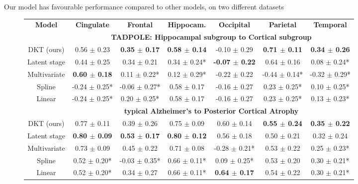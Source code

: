 \documentclass[portrait,a0,final,20pt]{a0poster}
\newcommand{\fnt}[1]{\LARGE{#1}}
\begin{document}
{\begin{multicols}{2}
\fnt{Our model has favourable performance compared to other models, on two different datasets}\\
\begin{figure}[H]
\fontsize{27}{30}\selectfont
\begin{tabular}{c | c c c c c c}
\textbf{Model} & \textbf{Cingulate} & \textbf{Frontal} & \textbf{Hippocam.} & \textbf{Occipital} & \textbf{Parietal} & \textbf{Temporal}\\
& \multicolumn{6}{c}{\textbf{TADPOLE: Hippocampal subgroup to Cortical subgroup}}\\
DKT (ours) &      0.56 $\pm$ 0.23 &    \textbf{0.35 $\pm$ 0.17} &        \textbf{0.58 $\pm$ 0.14} &     -0.10 $\pm$ 0.29 &     \textbf{0.71 $\pm$ 0.11} &     \textbf{0.34 $\pm$ 0.26} \\
Latent stage &      0.44 $\pm$ 0.25 &    0.34 $\pm$ 0.21 &       0.34 $\pm$ 0.24* &     \textbf{-0.07 $\pm$ 0.22} &     0.64 $\pm$ 0.16 &    0.08 $\pm$ 0.24* \\
Multivariate &      \textbf{0.60 $\pm$ 0.18} &   0.11 $\pm$ 0.22* &       0.12 $\pm$ 0.29* &     -0.22 $\pm$ 0.22 &   -0.44 $\pm$ 0.14* &   -0.32 $\pm$ 0.29* \\
Spline &    -0.24 $\pm$ 0.25* &  -0.06 $\pm$ 0.27* &        0.58 $\pm$ 0.17 &     -0.16 $\pm$ 0.27 &    0.23 $\pm$ 0.25* &    0.10 $\pm$ 0.25* \\
Linear &    -0.24 $\pm$ 0.25* &   0.20 $\pm$ 0.25* &        0.58 $\pm$ 0.17 &     -0.16 $\pm$ 0.27 &    0.23 $\pm$ 0.25* &    0.13 $\pm$ 0.23* \\
& \multicolumn{6}{c}{\textbf{typical Alzheimer's to Posterior Cortical Atrophy}}\\
DKT (ours) &    0.77 $\pm$ 0.11 &    0.39 $\pm$ 0.26 &      0.75 $\pm$ 0.09 &    0.60 $\pm$ 0.14 &    \textbf{0.55 $\pm$ 0.24} &    \textbf{0.35 $\pm$ 0.22} \\
Latent stage &    \textbf{0.80 $\pm$ 0.09} &    \textbf{0.53 $\pm$ 0.17} &      \textbf{0.80 $\pm$ 0.12} &    0.56 $\pm$ 0.18 &    0.50 $\pm$ 0.21 &    0.32 $\pm$ 0.24 \\
Multivariate &   0.73 $\pm$ 0.09 &   0.45 $\pm$ 0.22  &    0.71 $\pm$ 0.08 & -0.28 $\pm$ 0.21* &  0.53 $\pm$ 0.22  &  0.25 $\pm$ 0.23* \\
Spline &   0.52 $\pm$ 0.20* &  -0.03 $\pm$ 0.35* &     0.66 $\pm$ 0.11* &   0.09 $\pm$ 0.25* &    0.53 $\pm$ 0.20 &   0.30 $\pm$ 0.21* \\
Linear &   0.52 $\pm$ 0.20* &    0.34 $\pm$ 0.27 &     0.66 $\pm$ 0.11* &    \textbf{0.64 $\pm$ 0.17} &    0.54 $\pm$ 0.22 &   0.30 $\pm$ 0.21* \\
\end{tabular}
\vspace{0.5em}
\label{sec:dktPerfMetrics}
\end{figure}



\end{multicols}}
\end{document}
